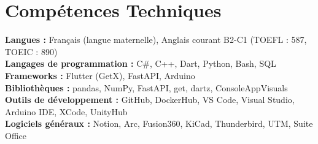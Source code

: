 \documentclass[letterpaper,11pt]{article}
\begin{document}
\section{Compétences Techniques}
 \begin{itemize}[leftmargin=0.15in, label={}]
    \small{\item{
     \textbf{Langues :}{ Français (langue maternelle), Anglais courant B2-C1 (TOEFL : 587, TOEIC : 890)} \\
     \textbf{Langages de programmation :}{ C\#, C++, Dart, Python, Bash, SQL} \\
     \textbf{Frameworks :}{ Flutter (GetX), FastAPI, Arduino} \\
     \textbf{Bibliothèques :}{ pandas, NumPy, FastAPI, get, dartz, ConsoleAppVisuals} \\
     \textbf{Outils de développement :}{ GitHub, DockerHub, VS Code, Visual Studio, Arduino IDE, XCode, UnityHub} \\
     \textbf{Logiciels généraux :}{ Notion, Arc, Fusion360, KiCad, Thunderbird, UTM, Suite Office}
    }}
 \end{itemize}
\end{document}
